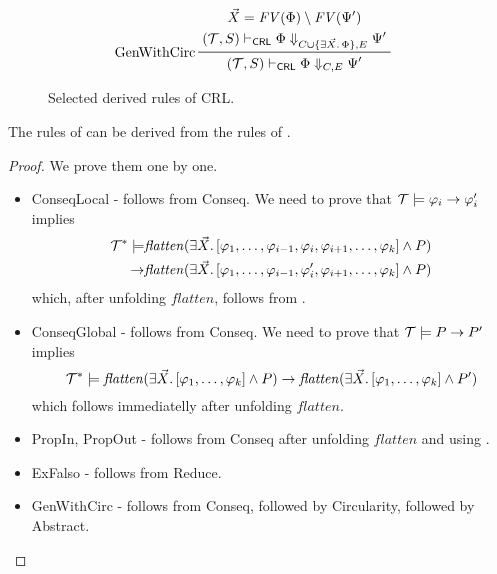 \begin{figure}
    \begin{align*}
    & \prftree[l]{GenWithCirc}
      { \prfStackPremises
        { \vec{X} = \mathit{FV}(\Phi) \setminus \mathit{FV}(\Psi^\prime)
        }
        {(\mathcal{T}, S) \provesCRL \Phi \Downarrow_{C \cup \{ \exists \vec{X}.\, \Phi  \}, E} \Psi^\prime}
      }
      {(\mathcal{T}, S) \provesCRL \Phi \Downarrow_{C, E} \Psi^\prime}
    \end{align*}

  
    \caption{Selected derived rules of CRL.}
    \label{fig:CRLderivedRules}
  \end{figure}
 

 \begin{lemma}
 The rules of  can be derived from the rules of .
 \end{lemma}
 \begin{proof}
    We prove them one by one.
    \begin{itemize}
        \item ConseqLocal - follows from Conseq. We need to prove that $\mathcal{T} \models \varphi_i \rightarrow \varphi_i^\prime$
              implies
              \begin{align*}
                \mathcal{T}^* \models & \mathit{flatten}(\exists \vec{X}.\, [\varphi_1,\ldots,\varphi_{i-1}, \varphi_i, \varphi_{i+1}, \ldots, \varphi_k] \land P) \\
                \rightarrow & \mathit{flatten}(\exists \vec{X}.\, [\varphi_1,\ldots,\varphi_{i-1}, \varphi_i^\prime, \varphi_{i+1}, \ldots, \varphi_k] \land P)
              \end{align*}
              which, after unfolding $\mathit{flatten}$, follows from .
        \item ConseqGlobal - follows from Conseq.
              We need to prove that $\mathcal{T} \models P \rightarrow P^\prime$
              implies
              \begin{equation*}
                \mathcal{T}^* \models \mathit{flatten}(\exists \vec{X}.\, [\varphi_1, \ldots, \varphi_k] \land P)
                \rightarrow \mathit{flatten}(\exists \vec{X}.\, [\varphi_1, \ldots, \varphi_k] \land P^\prime)
              \end{equation*}
              which follows immediatelly after unfolding $\mathit{flatten}$.
        \item PropIn, PropOut - follows from Conseq after unfolding $\mathit{flatten}$ and using .
        \item ExFalso - follows from Reduce.
        \item GenWithCirc - follows from Conseq, followed by Circularity, followed by Abstract.
    \end{itemize}
\end{proof}


